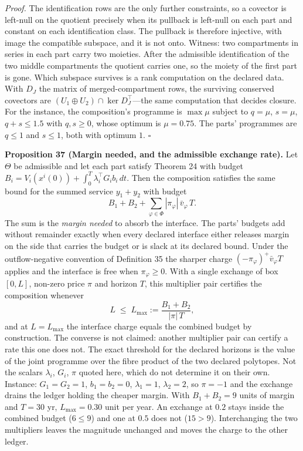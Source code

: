 \documentclass[11pt]{article}
\begin{document}
\emph{Proof.} The identification rows are the only further constraints, so a covector is left-null on the quotient precisely when its pullback is left-null on each part and constant on each identification class. The pullback is therefore injective, with image the compatible subspace, and it is not onto. Witness: two compartments in series in each part carry two moieties. After the admissible identification of the two middle compartments the quotient carries one, so the moiety of the first part is gone. Which subspace survives is a rank computation on the declared data. With \(D_J\) the matrix of merged-compartment rows, the surviving conserved covectors are \((U_1 \oplus U_2) \cap \ker D_J^{\top}\)---the same computation that decides closure. For the instance, the composition's programme is \(\max \mu\) subject to \(q = \mu\), \(s = \mu\), \(q + s \le 1.5\) with \(q, s \ge 0\), whose optimum is \(\mu = 0.75\). The parts' programmes are \(q \le 1\) and \(s \le 1\), both with optimum \(1\). \ensuremath{\square}

\textbf{Proposition 37 (Margin needed, and the admissible exchange rate).} Let \(\Theta\) be admissible and let each part satisfy Theorem 24 with budget \(B_i = V_i(x^i(0)) + \int_0^T \lambda_i^{\top} G_i b_i\,dt\). Then the composition satisfies the same bound for the summed service \(y_1 + y_2\) with budget \[
B_1 + B_2 + \sum_{\varphi \in \Phi} |\pi_\varphi|\, \bar v_\varphi\, T .
\] The sum is the \emph{margin needed} to absorb the interface. The parts' budgets add without remainder exactly when every declared interface either releases margin on the side that carries the budget or is slack at its declared bound. Under the outflow-negative convention of Definition 35 the sharper charge \((-\pi_\varphi)^{+}\bar v_\varphi T\) applies and the interface is free when \(\pi_\varphi \ge 0\). With a single exchange of box \([0, L]\), non-zero price \(\pi\) and horizon \(T\), this multiplier pair certifies the composition whenever \[
L \;\le\; L_{\max} := \frac{B_1 + B_2}{|\pi|\, T},
\] and at \(L = L_{\max}\) the interface charge equals the combined budget by construction. The converse is not claimed: another multiplier pair can certify a rate this one does not. The exact threshold for the declared horizons is the value of the joint programme over the fibre product of the two declared polytopes. Not the scalars \(\lambda_i\), \(G_i\), \(\pi\) quoted here, which do not determine it on their own. Instance: \(G_1 = G_2 = 1\), \(b_1 = b_2 = 0\), \(\lambda_1 = 1\), \(\lambda_2 = 2\), so \(\pi = -1\) and the exchange drains the ledger holding the cheaper margin. With \(B_1 + B_2 = 9\) units of margin and \(T = 30\) yr, \(L_{\max} = 0.30\) unit per year. An exchange at \(0.2\) stays inside the combined budget (\(6 \le 9\)) and one at \(0.5\) does not (\(15 > 9\)). Interchanging the two multipliers leaves the magnitude unchanged and moves the charge to the other ledger.
\end{document}
